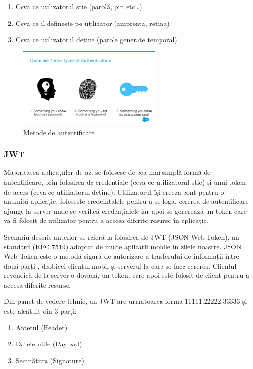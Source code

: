 \documentclass[12pt]{article}
\begin{document}
\begin{enumerate}
    \item Ceva ce utilizatorul știe (parolă, pin etc\dots)
    \item Ceva ce il definește pe utilizator (amprenta, retina)
    \item Ceva ce utilizatorul deține (parole generate temporal)
\end{enumerate}

\begin{figure}[H]
\centering
\includegraphics[height=4cm]{3ways.jpg}
\caption{Metode de autentificare \cite{3ways-auth}}
\end{figure}

\subsubsection{JWT}

Majoritatea aplicațiilor de azi se folosesc de cea mai simplă formă de autentificare,
prin folosirea de credentiale (ceva ce utilizatorul știe) și unui token de acces (ceva
ce utilizatorul deține). Utilizatorul își creeza cont pentru o anumită aplicație, folosește
credeințalele pentru a se loga, cererea de autentificare ajunge la server unde se verifică
credențialele iar apoi se generează un token care va fi folosit de utilizator pentru a accesa
diferite resurse în aplicație.

Scenariu descris anterior se referă la folosirea de JWT (JSON Web Token), un standard (RFC 7519) \cite{rfc-7519} 
adoptat de multe aplicații mobile în zilele noastre. 
JSON Web Token este o metodă sigură de autorizare a trasferului
de informații între două părți \cite{jwt}, deobicei 
clientul mobil și serverul la care se face cererea. Clientul revendică de la server
o dovadă, un token, care apoi este folosit de client pentru a accesa diferite 
resurse.

Din punct de vedere tehnic, un JWT are urmatoarea forma 11111.22222.33333 și este
alcătuit din 3 parți:

\begin{enumerate}
    \item Antetul (Header)
    \item Datele utile (Payload)
    \item Semnătura (Signature)
\end{enumerate}
\end{document}

